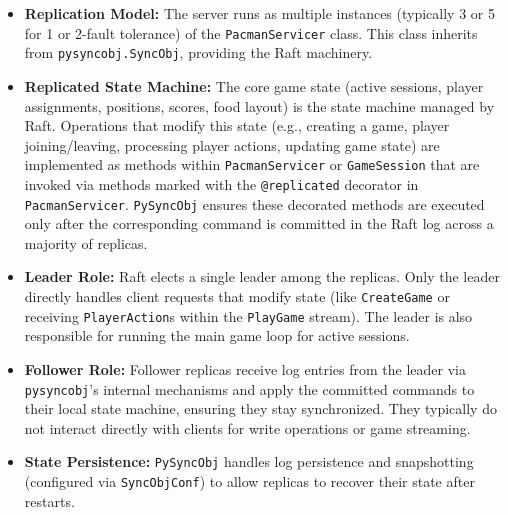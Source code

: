 \documentclass[11pt]{article}
\begin{document}
\begin{itemize}
  \item \textbf{Replication Model:} The server runs as multiple instances (typically 3 or 5 for 1 or 2-fault tolerance) of the \texttt{PacmanServicer} class. This class inherits from \texttt{pysyncobj.SyncObj}, providing the Raft machinery.
  \item \textbf{Replicated State Machine:} The core game state (active sessions, player assignments, positions, scores, food layout) is the state machine managed by Raft. Operations that modify this state (e.g., creating a game, player joining/leaving, processing player actions, updating game state) are implemented as methods within \texttt{PacmanServicer} or \texttt{GameSession} that are invoked via methods marked with the \texttt{@replicated} decorator in \texttt{PacmanServicer}. \texttt{PySyncObj} ensures these decorated methods are executed only after the corresponding command is committed in the Raft log across a majority of replicas.
  \item \textbf{Leader Role:} Raft elects a single leader among the replicas. Only the leader directly handles client requests that modify state (like \texttt{CreateGame} or receiving \texttt{PlayerAction}s within the \texttt{PlayGame} stream). The leader is also responsible for running the main game loop for active sessions.
  \item \textbf{Follower Role:} Follower replicas receive log entries from the leader via \texttt{pysyncobj}'s internal mechanisms and apply the committed commands to their local state machine, ensuring they stay synchronized. They typically do not interact directly with clients for write operations or game streaming.
  \item \textbf{State Persistence:} \texttt{PySyncObj} handles log persistence and snapshotting (configured via \texttt{SyncObjConf}) to allow replicas to recover their state after restarts.
\end{itemize}
\end{document}
